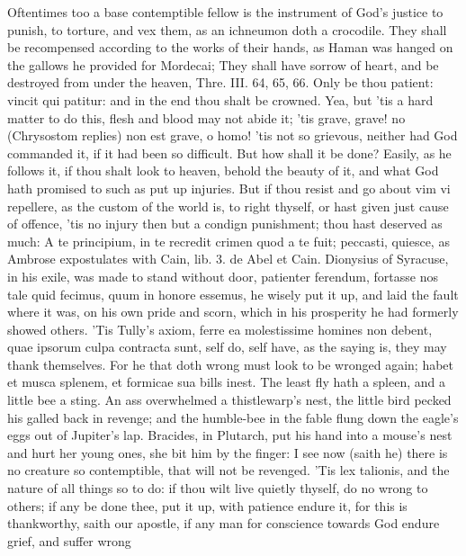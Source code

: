 {Oftentimes too a base contemptible fellow is the instrument of God's
justice to punish, to torture, and vex them, as an ichneumon doth a
crocodile. They shall be recompensed according to the works of their
hands, as Haman was hanged on the gallows he provided for Mordecai;
They shall have sorrow of heart, and be destroyed from under the
heaven, Thre. III. 64, 65, 66. Only be thou patient: vincit qui
patitur: and in the end thou shalt be crowned. Yea, but 'tis a hard
matter to do this, flesh and blood may not abide it; 'tis grave, grave!
no (Chrysostom replies) non est grave, o homo! 'tis not so grievous,
neither had God commanded it, if it had been so difficult. But
how shall it be done? Easily, as he follows it, if thou shalt look to
heaven, behold the beauty of it, and what God hath promised to such as
put up injuries. But if thou resist and go about vim vi repellere, as
the custom of the world is, to right thyself, or hast given just cause
of offence, 'tis no injury then but a condign punishment; thou hast
deserved as much: A te principium, in te recredit crimen quod a te
fuit; peccasti, quiesce, as Ambrose expostulates with Cain, lib. 3. de
Abel et Cain. Dionysius of Syracuse, in his exile, was made to
stand without door, patienter ferendum, fortasse nos tale quid fecimus,
quum in honore essemus, he wisely put it up, and laid the fault where
it was, on his own pride and scorn, which in his prosperity he had
formerly showed others. 'Tis  Tully's axiom, ferre ea
molestissime homines non debent, quae ipsorum culpa contracta sunt,
self do, self have, as the saying is, they may thank themselves. For he
that doth wrong must look to be wronged again; habet et musca splenem,
et formicae sua bills inest. The least fly hath a spleen, and a little
bee a sting. An ass overwhelmed a thistlewarp's nest, the little
bird pecked his galled back in revenge; and the humble-bee in the fable
flung down the eagle's eggs out of Jupiter's lap. Bracides, in
Plutarch, put his hand into a mouse's nest and hurt her young ones, she
bit him by the finger: I see now (saith he) there is no creature
so contemptible, that will not be revenged. 'Tis lex talionis, and the
nature of all things so to do: if thou wilt live quietly thyself,
do no wrong to others; if any be done thee, put it up, with
patience endure it, for this is thankworthy, saith our apostle,
if any man for conscience towards God endure grief, and suffer wrong
}
